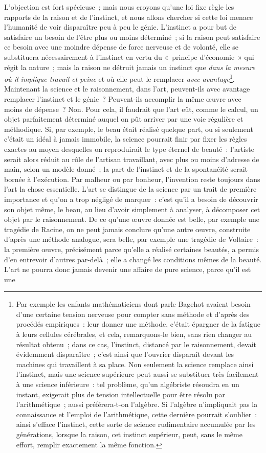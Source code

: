 \documentclass[french,twoside]{book} %
\begin{document}
L’objection est fort spécieuse ; mais nous croyons qu’une loi fixe règle les rapports de la raison et de l’instinct, et nous allons chercher si cette loi menace l’humanité de voir disparaître peu à peu le génie. L’instinct a pour but de satisfaire un besoin de l’être plus ou moins déterminé ; si la raison peut satisfaire ce besoin avec une moindre dépense de force nerveuse et de volonté, elle se substituera nécessairement à l’instinct en vertu du « principe d’économie » qui régit la nature ; mais la raison ne détruit jamais un instinct que \emph{dans la mesure où il implique travail et peine} et où elle peut le remplacer \emph{avec avantage}\footnote{Par exemple les enfants mathématiciens dont parle Bagehot avaient besoin d’une certaine tension nerveuse pour compter sans méthode et d’après des procédés empiriques : leur donner une méthode, c’était épargner de la fatigue à leurs cellules cérébrales, et cela, remarquons-le bien, sans rien changer au résultat obtenu ; dans ce cas, l’instinct, distancé par le raisonnement, devait évidemment disparaître ; c’est ainsi que l’ouvrier disparaît devant les machines qui travaillent à sa place. Non seulement la science remplace ainsi l’instinct, mais une science supérieure peut aussi se substituer très facilement à une science inférieure : tel problème, qu’un algébriste résoudra en un instant, exigerait plus de tension intellectuelle pour être résolu par l’arithmétique ; aussi préférera-t-on l’algèbre. Si l’algèbre n’impliquait pas la connaissance et l’emploi de l’arithmétique, cette dernière pourrait s’oublier : ainsi s’efface l’instinct, cette sorte de science rudimentaire accumulée par les générations, lorsque la raison, cet instinct supérieur, peut, sans le même effort, remplir exactement la même fonction.}. Maintenant la science et le raisonnement, dans l’art, peuvent-ils avec avantage remplacer l’instinct et le génie ? Peuvent-ils accomplir la même œuvre avec moins de dépense ? Non. Pour cela, il faudrait que l’art eût, comme le calcul, un objet parfaitement  déterminé auquel on pût arriver par une voie régulière et méthodique. Si, par exemple, le beau était réalisé quelque part, ou si seulement c’était un idéal à jamais immobile, la science pourrait finir par fixer les règles exactes au moyen desquelles on reproduirait le type éternel de beauté : l’artiste serait alors réduit au rôle de l’artisan travaillant, avec plus ou moins d’adresse de main, selon un modèle donné ; la part de l’instinct et de la spontanéité serait bornée à l’exécution. Par malheur ou par bonheur, l’invention reste toujours dans l’art la chose essentielle. L’art se distingue de la science par un trait de première importance et qu’on a trop négligé de marquer : c’est qu’il a besoin de découvrir son objet même, le beau, au lieu d’avoir simplement à analyser, à décomposer cet objet par le raisonnement. De ce qu’une œuvre donnée est belle, par exemple une tragédie de Racine, on ne peut jamais conclure qu’une autre œuvre, construite d’après une méthode analogue, sera belle, par exemple une tragédie de Voltaire : la première œuvre, précisément parce qu’elle a réalisé certaines beautés, a permis d’en entrevoir d’autres par-delà ; elle a changé les conditions mêmes de la beauté. L’art ne pourra donc jamais devenir une affaire de pure science, parce qu’il est une 
\end{document}
